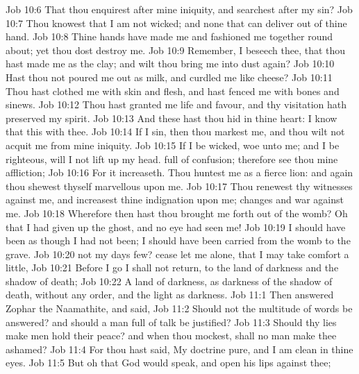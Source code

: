 \vs Job 10:6 That thou enquirest after mine iniquity, and searchest after my sin?
\vs Job 10:7 Thou knowest that I am not wicked; and  none that can deliver out of thine hand.
\vs Job 10:8 Thine hands have made me and fashioned me together round about; yet thou dost destroy me.
\vs Job 10:9 Remember, I beseech thee, that thou hast made me as the clay; and wilt thou bring me into dust again?
\vs Job 10:10 Hast thou not poured me out as milk, and curdled me like cheese?
\vs Job 10:11 Thou hast clothed me with skin and flesh, and hast fenced me with bones and sinews.
\vs Job 10:12 Thou hast granted me life and favour, and thy visitation hath preserved my spirit.
\vs Job 10:13 And these  hast thou hid in thine heart: I know that this  with thee.
\vs Job 10:14 If I sin, then thou markest me, and thou wilt not acquit me from mine iniquity.
\vs Job 10:15 If I be wicked, woe unto me; and  I be righteous,  will I not lift up my head.  full of confusion; therefore see thou mine affliction;
\vs Job 10:16 For it increaseth. Thou huntest me as a fierce lion: and again thou shewest thyself marvellous upon me.
\vs Job 10:17 Thou renewest thy witnesses against me, and increasest thine indignation upon me; changes and war  against me.
\vs Job 10:18 Wherefore then hast thou brought me forth out of the womb? Oh that I had given up the ghost, and no eye had seen me!
\vs Job 10:19 I should have been as though I had not been; I should have been carried from the womb to the grave.
\vs Job 10:20  not my days few? cease  let me alone, that I may take comfort a little,
\vs Job 10:21 Before I go  I shall not return,  to the land of darkness and the shadow of death;
\vs Job 10:22 A land of darkness, as darkness  of the shadow of death, without any order, and  the light  as darkness.
\vs Job 11:1 Then answered Zophar the Naamathite, and said,
\vs Job 11:2 Should not the multitude of words be answered? and should a man full of talk be justified?
\vs Job 11:3 Should thy lies make men hold their peace? and when thou mockest, shall no man make thee ashamed?
\vs Job 11:4 For thou hast said, My doctrine  pure, and I am clean in thine eyes.
\vs Job 11:5 But oh that God would speak, and open his lips against thee;
